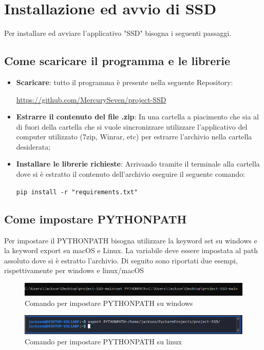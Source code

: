 \section{Installazione ed avvio di SSD}
Per installare ed avviare l'applicativo "SSD" bisogna i seguenti passaggi.
\subsection{Come scaricare il programma e le librerie}

\begin{itemize}
	\item \textbf{Scaricare}: tutto il programma è presente nella seguente Repository:\newline{}
\centerline{\url{https://github.com/MercurySeven/project-SSD}}

	\item \textbf{Estrarre il contenuto del file .zip}: In una cartella a piacimento che sia al di fuori della cartella che si vuole sincronizzare utilizzare l'applicativo del computer utilizzato (7zip, Winrar, etc) per estrarre l'archivio nella cartella desiderata;
	\item \textbf{Installare le librerie richieste}:
	Arrivando tramite il terminale alla cartella dove si è estratto il contenuto dell'archivio eseguire il seguente comando:\newline{}
	\centerline{\texttt{pip install -r "requirements.txt"}}
\end{itemize}
\subsection{Come impostare PYTHONPATH}
Per impostare il PYTHONPATH bisogna utilizzare la keyword set su windows e la keyword export su macOS e Linux. La variabile deve essere impostata al path assoluto dove si è estratto l'archivio.
Di seguito sono riportati due esempi, rispettivamente per windows e linux/macOS
\begin{figure}[H]
    \centering
    \includegraphics[scale = 0.65]{components/img/Windows-istruzione-1.png}
    \caption{Comando per impostare PYTHONPATH su windows}
    \label{fig:comando per impostare PYTHONPATH su windows}
\end{figure}
\begin{figure}[H]
    \centering
    \includegraphics[scale = 0.50]{components/img/linux-istruzione-1.jpg}
    \caption{ Comando per impostare PYTHONPATH su linux}
    \label{fig:comando per impostare PYTHONPATH su windows}
\end{figure}
